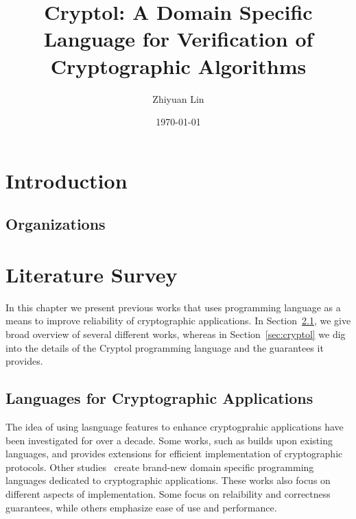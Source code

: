 \documentclass[a4paper, notitlepage]{report}
\title{Cryptol: A Domain Specific Language for  Verification of Cryptographic Algorithms}
\author{Zhiyuan Lin}
\date{\today}
\begin{document}
\maketitle
\begin{abstract}

\end{abstract}

\newpage
\vspace{30pt}



\chapter{Introduction}

\section{Organizations}

\chapter{Literature Survey}

In this chapter we present previous works that uses programming
language as a means to improve reliability of cryptographic applications.
In Section~\ref{sec:crypto_lang}, we give broad overview of several different
works, whereas in Section~\ref{sec:cryptol} we dig into the details of
the Cryptol programming language and the guarantees it provides.

\section{Languages for Cryptographic Applications}
\label{sec:crypto_lang}

The idea of using lasnguage features to enhance cryptogprahic applications 
have been investigated for over a decade. Some works, such 
as \cite{akinyele2013charm} builds upon existing languages, and provides
extensions for efficient implementation of cryptographic protocols. 
Other studies~\cite{lewis2003cryptol} create brand-new domain specific 
programming languages dedicated to cryptographic applications. These
works also focus on different aspects of implementation. Some focus
on relaibility and correctness guarantees, while others emphasize ease 
of use and performance.
\end{document}
